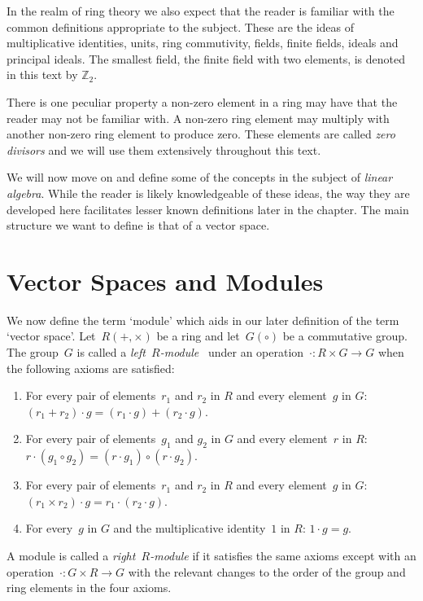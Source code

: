In the realm of ring theory we also expect that the reader is familiar with the common definitions appropriate to the subject.
These are the ideas of multiplicative identities, units, ring commutivity, fields, finite fields, ideals and principal ideals.
The smallest field, the finite field with two elements, is denoted in this text by $\mathbb{Z}_2$.

There is one peculiar property a non-zero element in a ring may have that the reader may not be familiar with.
A non-zero ring element may multiply with another non-zero ring element to produce zero.
These elements are called \emph{zero divisors} and we will use them extensively throughout this text.

We will now move on and define some of the concepts in the subject of \emph{linear algebra}.
While the reader is likely knowledgeable of these ideas, the way they are developed here facilitates lesser known definitions later in the chapter.
The main structure we want to define is that of a vector space.

\section{Vector Spaces and Modules}
We now define the term `module' which aids in our later definition of the term `vector space'.
Let~$R(+,\times)$ be a ring and let~$G(\circ)$ be a commutative group.
The group~$G$ is called a \emph{left~$R$-module}~\cite[p.]{mac99} under an operation~$\cdot:R \times G \rightarrow G$ when the following axioms are satisfied:
\begin{enumerate}
	\item For every pair of elements~$r_1$ and $r_2$ in $R$ and every element~$g$ in $G$: $(r_1 + r_2) \cdot g = (r_1 \cdot g) + (r_2 \cdot g)$.
	\item For every pair of elements~$g_1$ and $g_2$ in $G$ and every element~$r$ in $R$: $r \cdot (g_1 \circ g_2) = ( r \cdot g_1 ) \circ ( r \cdot g_2)$.
	\item For every pair of elements~$r_1$ and $r_2$ in $R$ and every element~$g$ in $G$: $(r_1 \times r_2) \cdot g  = r_1 \cdot (r_2 \cdot g)$.
	\item For every~$g$ in $G$ and the multiplicative identity~$1$ in $R$: $1 \cdot g = g$.
\end{enumerate}
A module is called a \emph{right~$R$-module} if it satisfies the same axioms except with an operation~$\cdot:G \times R \rightarrow G$ with the relevant changes to the order of the group and ring elements in the four axioms.

